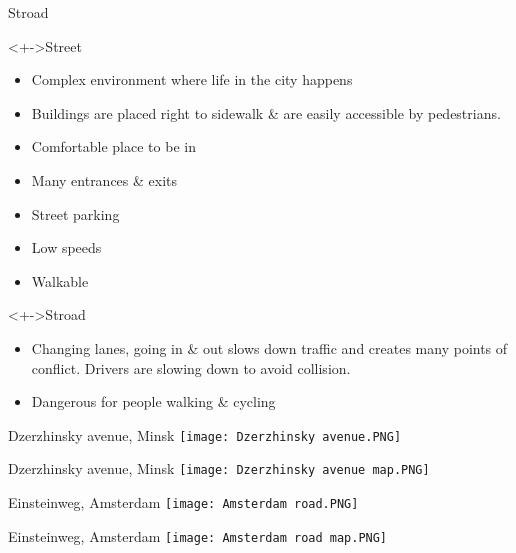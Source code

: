 \documentclass{beamer}
\begin{document}
    \begin{frame}{Stroad}
        \begin{block}
            <+->{Street}
            \begin{itemize}
                \item Complex environment where life in the city happens
                \item Buildings are placed right to sidewalk \& are easily accessible by pedestrians.
                \item Comfortable place to be in
                \item Many entrances \& exits
                \item Street parking
                \item Low speeds
                \item Walkable
            \end{itemize}
        \end{block}
        \begin{block}
            <+->{Stroad}
            \begin{itemize}
                \item Changing lanes, going in \& out slows down traffic and creates many points of conflict. Drivers are slowing down to avoid collision.
                \item Dangerous for people walking \& cycling
            \end{itemize}
        \end{block}
    \end{frame}

    \begin{frame}{Dzerzhinsky avenue, Minsk}
        \texttt{[image: Dzerzhinsky avenue.PNG]}
    \end{frame}

    \begin{frame}{Dzerzhinsky avenue, Minsk}
        \texttt{[image: Dzerzhinsky avenue map.PNG]}
    \end{frame}

    \begin{frame}{Einsteinweg, Amsterdam}
        \texttt{[image: Amsterdam road.PNG]}
    \end{frame}

    \begin{frame}{Einsteinweg, Amsterdam}
        \texttt{[image: Amsterdam road map.PNG]}
    \end{frame}
\end{document}
